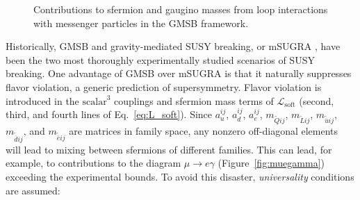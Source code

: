 \documentclass[dissertation.tex]{subfiles}
\begin{document}
\begin{figure}
	\caption{Contributions to sfermion and gaugino masses from loop interactions with messenger particles in the GMSB framework.}
	\label{fig:gaugino_sfermion_GMSB_mass_terms}
\end{figure}

Historically, GMSB and gravity-mediated SUSY breaking, or mSUGRA \cite{mSUGRA}, have been the two most thoroughly experimentally studied scenarios of SUSY breaking.  One advantage of GMSB over mSUGRA is that it naturally suppresses flavor violation, a generic prediction of supersymmetry.  Flavor violation is introduced in the $\mbox{scalar}^{3}$ couplings and sfermion mass terms of $\mathcal{L}_{\mathrm{soft}}$ (second, third, and fourth lines of Eq.~\ref{eq:L_soft}).  Since $a_{u}^{ij}$, $a_{d}^{ij}$, $a_{e}^{ij}$, $m_{\widetilde{Q}ij}$, $m_{\widetilde{L}ij}$, $m_{\widetilde{\overline{u}}ij}$, $m_{\widetilde{\overline{d}}ij}$, and $m_{\widetilde{\overline{e}}ij}$ are matrices in family space, any nonzero off-diagonal elements will lead to mixing between sfermions of different families.  This can lead, for example, to contributions to the diagram $\mu\rightarrow e\gamma$ (Figure~\ref{fig:muegamma}) exceeding the experimental bounds.  To avoid this disaster, \textit{universality} conditions are assumed:
\end{document}
